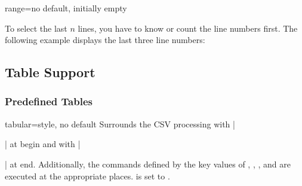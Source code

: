 \documentclass[a4paper,11pt]{ltxdoc}
\begin{document}
\begin{docCsvKey}[][doc new=2021-06-29]{range}{=}{no default, initially empty}
\begin{dispExample}
\end{dispExample}

\begin{dispExample}
\end{dispExample}

To select the last $n$ lines, you have to know or count the line numbers first.
The following example displays the last three line numbers:

\begin{dispExample}
\end{dispExample}

\end{docCsvKey}



\clearpage
\subsection{Table Support}\label{subsec:tabsupport}%

\subsubsection{Predefined Tables}\label{subsubsec:table_predef}

\begin{docCsvKey}{tabular}{=}{style, no default}
  Surrounds the CSV processing with |\begin{tabular}|
  at begin and with |\end{tabular}| at end.
  Additionally, the commands defined by the key values of
  , , ,
  and  are executed at the appropriate places.
   is set to \cs{}\cs{}.
\end{docCsvKey}
\end{document}
